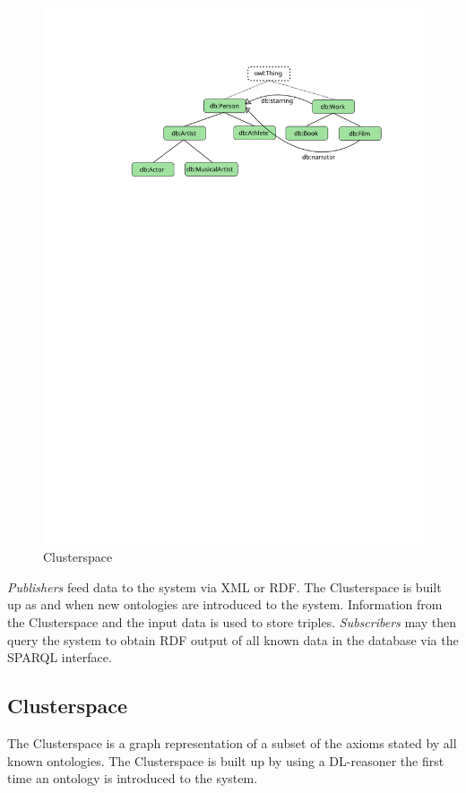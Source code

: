 \documentclass[journal]{IEEEtran}
\begin{document}
\begin{figure}
    \centering
    \includegraphics[scale=0.6]{images/cs}
    \caption{Clusterspace}
    \label{fig:cs}
\end{figure}

\emph{Publishers} feed data to the system via XML or RDF. The Clusterspace is
built up as and when new ontologies are introduced to the system. Information
from the Clusterspace and the input data is used to store triples.
\emph{Subscribers} may then query the system to obtain RDF output of all known
data in the database via the SPARQL interface.

\subsection{Clusterspace}
The Clusterspace is a graph representation of a subset of the axioms stated by
all known ontologies. The Clusterspace is built up by using a DL-reasoner the
first time an ontology is introduced to the system.
\end{document}
